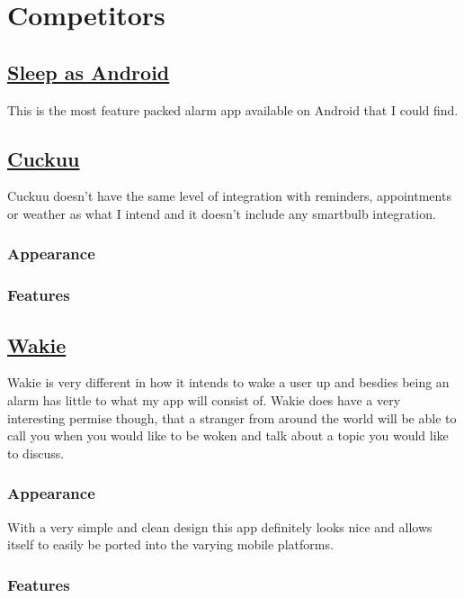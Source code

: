 \section{Competitors}\label{competitors}

\subsection{\texorpdfstring{\href{http://sleep.urbandroid.org/}{Sleep as
Android}}{Sleep as Android}}\label{sleep-as-android}

This is the most feature packed alarm app available on Android that I
could find.

\subsection{\texorpdfstring{\href{https://cuckuu.com/}{Cuckuu}}{Cuckuu}}\label{cuckuu}

Cuckuu doesn't have the same level of integration with reminders,
appointments or weather as what I intend and it doesn't include any
smartbulb integration.

\subsubsection{Appearance}\label{appearance}

\subsubsection{Features}\label{features}

\subsection{\texorpdfstring{\href{https://wakie.com/}{Wakie}}{Wakie}}\label{wakie}

Wakie is very different in how it intends to wake a user up and besdies
being an alarm has little to what my app will consist of. Wakie does
have a very interesting permise though, that a stranger from around the
world will be able to call you when you would like to be woken and talk
about a topic you would like to discuss.

\subsubsection{Appearance}\label{appearance-1}

With a very simple and clean design this app definitely looks nice and
allows itself to easily be ported into the varying mobile platforms.

\subsubsection{Features}\label{features-1}
